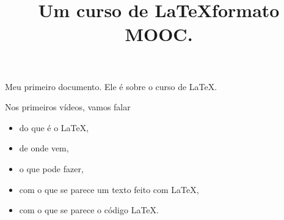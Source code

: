 \documentclass[12pt]{memoir}
\begin{document}
\title{Um curso de \LaTeX formato MOOC.}


\maketitle


Meu primeiro documento.
Ele é sobre o curso de \LaTeX.

Nos primeiros vídeos, vamos falar
\begin{itemize}
\item do que é o \LaTeX,
\item de onde vem,
\item o que pode fazer,
\item com o que se parece um texto feito com \LaTeX,
\item com o que se parece o código \LaTeX.
\end{itemize}
\end{document}
